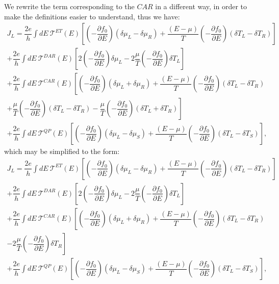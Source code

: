 We rewrite the term corresponding to the $CAR$ in a different way, in order to make the definitions easier to understand, thus we have:
\begin{multline*}
J_{L}
=
\dfrac{2e}{h}\int dE~\mathcal{T}^{ET}(E)
\left[
\left(-\dfrac{\partial f_{0}}{\partial E}\right)(\delta\mu_{L}-\delta\mu_{R})
+
\dfrac{(E-\mu)}{T}\left(-\dfrac{\partial f_{0}}{\partial E}\right)(\delta T_{L}-\delta T_{R})
\right]
\\+
\dfrac{2e}{h}\int dE~\mathcal{T}^{DAR}(E)
\left[
2\left(-\dfrac{\partial f_{0}}{\partial E}\right)\delta\mu_{L}
-2
\dfrac{\mu}{T}\left(-\dfrac{\partial f_{0}}{\partial E}\right)\delta T_{L}
\right]
\\+
\dfrac{2e}{h}\int dE~\mathcal{T}^{CAR}(E)\left[
\left(-\dfrac{\partial f_{0}}{\partial E}\right)(\delta\mu_{L}+\delta\mu_{R})
+
\dfrac{(E-\mu)}{T}\left(-\dfrac{\partial f_{0}}{\partial E}\right)(\delta T_{L}-\delta T_{R})
\right.\\\left.+
\dfrac{\mu}{T}\left(-\dfrac{\partial f_{0}}{\partial E}\right)(\delta T_{L}-\delta T_{R})
-
\dfrac{\mu}{T}\left(-\dfrac{\partial f_{0}}{\partial E}\right)(\delta T_{L}+\delta T_{R})
\right]
\\+\dfrac{2e}{h}\int dE~\mathcal{T}^{QP}(E)
\left[
\left(-\dfrac{\partial f_{0}}{\partial E}\right)(\delta\mu_{L}-\delta\mu_{S})
+
\dfrac{(E-\mu)}{T}\left(-\dfrac{\partial f_{0}}{\partial E}\right)(\delta T_{L}-\delta T_{S})
\right],
\end{multline*}
which may be simplified to the form:
\begin{multline}\label{current6}
J_{L}
=
\dfrac{2e}{h}\int dE~\mathcal{T}^{ET}(E)
\left[
\left(-\dfrac{\partial f_{0}}{\partial E}\right)(\delta\mu_{L}-\delta\mu_{R})
+
\dfrac{(E-\mu)}{T}\left(-\dfrac{\partial f_{0}}{\partial E}\right)(\delta T_{L}-\delta T_{R})
\right]
\\+
\dfrac{2e}{h}\int dE~\mathcal{T}^{DAR}(E)
\left[
2\left(-\dfrac{\partial f_{0}}{\partial E}\right)\delta\mu_{L}
-2
\dfrac{\mu}{T}\left(-\dfrac{\partial f_{0}}{\partial E}\right)\delta T_{L}
\right]
\\+
\dfrac{2e}{h}\int dE~\mathcal{T}^{CAR}(E)\left[
\left(-\dfrac{\partial f_{0}}{\partial E}\right)(\delta\mu_{L}+\delta\mu_{R})
+
\dfrac{(E-\mu)}{T}\left(-\dfrac{\partial f_{0}}{\partial E}\right)(\delta T_{L}-\delta T_{R})
\right.\\\left.-2
\dfrac{\mu}{T}\left(-\dfrac{\partial f_{0}}{\partial E}\right)\delta T_{R}
\right]
\\+\dfrac{2e}{h}\int dE~\mathcal{T}^{QP}(E)
\left[
\left(-\dfrac{\partial f_{0}}{\partial E}\right)(\delta\mu_{L}-\delta\mu_{S})
+
\dfrac{(E-\mu)}{T}\left(-\dfrac{\partial f_{0}}{\partial E}\right)(\delta T_{L}-\delta T_{S})
\right],
\end{multline}



